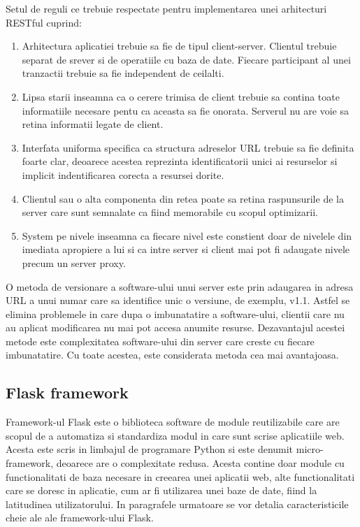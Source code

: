 Setul de reguli ce trebuie respectate pentru implementarea unei arhitecturi RESTful cuprind:
\begin{enumerate}
	\item Arhitectura aplicatiei trebuie sa fie de tipul client-server. Clientul trebuie separat de srever si de operatiile cu baza de date. Fiecare 
    participant al unei tranzactii trebuie sa fie independent de ceilalti.
	\item Lipsa starii inseamna ca o cerere trimisa de client trebuie sa contina toate informatiile necesare pentu ca aceasta sa fie onorata. Serverul 
	nu are voie sa retina informatii legate de client.
    \item Interfata uniforma specifica ca structura adreselor URL trebuie sa fie definita foarte clar, deoarece acestea reprezinta identificatorii unici 
    ai resurselor si implicit indentificarea corecta a resursei dorite.
    \item Clientul sau o alta componenta din retea poate sa retina raspunsurile de la server care sunt semnalate ca fiind memorabile cu scopul 
    optimizarii. 
    \item System pe nivele inseamna ca fiecare nivel este constient doar de nivelele din imediata apropiere a lui si ca intre server si client mai pot fi 
    adaugate nivele precum un server proxy.
\end{enumerate}

O metoda de versionare a software-ului unui server este prin adaugarea in adresa URL a unui numar care sa identifice unic o versiune, de exemplu, v1.1. 
Astfel se elimina problemele in care dupa o imbunatatire a software-ului, clientii care nu au aplicat modificarea nu mai pot accesa anumite resurse. 
Dezavantajul acestei metode este complexitatea software-ului din server care creste cu fiecare imbunatatire. Cu toate acestea, este considerata metoda 
cea mai avantajoasa.

\subsection{Flask framework}\label{sec:flask}
Framework-ul Flask este o biblioteca software de module reutilizabile care are scopul de a automatiza si standardiza modul in care sunt scrise aplicatiile 
web. Acesta este scris in limbajul de programare Python si este denumit micro-framework, deoarece are o complexitate redusa. Acesta contine doar module 
cu functionalitati de baza necesare in creearea unei aplicatii web, alte functionalitati care se doresc in aplicatie, cum ar fi utilizarea unei baze de 
date, fiind la latitudinea utilizatorului. In paragrafele urmatoare se vor detalia caracteristicile cheie ale ale framework-ului Flask.

